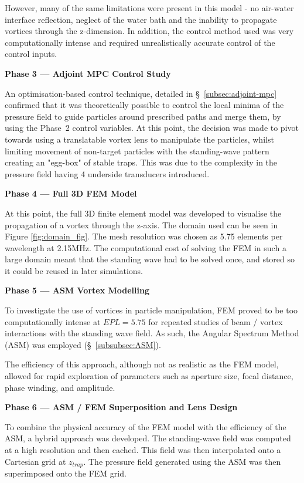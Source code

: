 \documentclass[11pt,a4paper]{article}
\newcommand{\subsubsubsection}[1]{%
  \par\medskip
  \noindent\textbf{#1}\par\nobreak\noindent\ignorespaces
}
\begin{document}
However, many of the same limitations were present in this model - no air-water interface reflection, neglect of the water bath and the inability to propagate vortices through the z-dimension. In addition, the control method used was very computationally intense and required unrealistically accurate control of the control inputs.


\subsubsubsection{Phase 3 — Adjoint MPC Control Study}
An optimisation-based control technique, detailed in \S~\ref{subsec:adjoint-mpc} confirmed that it was theoretically possible to control the local minima of the pressure field to guide particles around prescribed paths and merge them, by using the Phase~2 control variables.  
At this point, the decision was made to pivot towards using a translatable vortex lens to manipulate the particles, whilst limiting movement of non-target particles with the standing-wave pattern creating an "egg-box" of stable traps. This was due to the complexity in the pressure field having 4 underside transducers introduced. 

\subsubsubsection{Phase 4 — Full 3D FEM Model}
At this point, the full 3D finite element model was developed to visualise the propagation of a vortex through the z-axis. The domain used can be seen in Figure \ref{fig:domain_fig}. The mesh resolution was chosen as 5.75 elements per wavelength at 2.15MHz. The computational cost of solving the FEM in such a large domain meant that the standing wave had to be solved once, and stored so it could be reused in later simulations. 

\subsubsubsection{Phase 5 — ASM Vortex Modelling}

To investigate the use of vortices in particle manipulation, FEM proved to be too computationally intense at $EPL = 5.75$ for repeated studies of beam / vortex interactions with the standing wave field. As such, the Angular Spectrum Method (ASM) was employed (\S~\ref{subsubsec:ASM}).

The efficiency of this approach, although not as realistic as the FEM model, allowed for rapid exploration of parameters such as aperture size, focal distance, phase winding, and amplitude. 

\subsubsubsection{Phase 6 — ASM / FEM Superposition and Lens Design}

To combine the physical accuracy of the FEM model with the efficiency of the ASM, a hybrid approach was developed. The standing-wave field was computed at a high resolution and then cached. This field was then interpolated onto a Cartesian grid at $z_{trap}$. The pressure field generated using the ASM was then superimposed onto the FEM grid.
\end{document}
